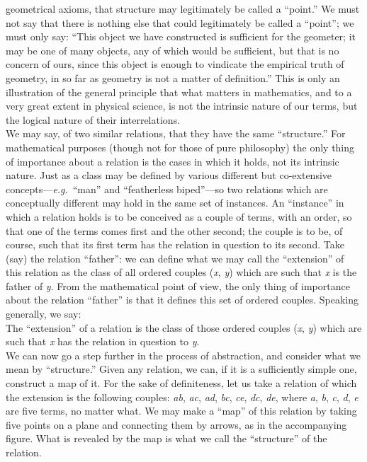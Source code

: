 {geometrical axioms, that structure may legitimately be called a
``point.'' We must not say that there is nothing else that could
legitimately be
called a ``point''; we must only say: ``This object we have constructed
is sufficient for the geometer; it may be one of many objects, any of
which would be sufficient, but that is no concern of ours, since this
object is enough to vindicate the empirical truth of geometry, in so
far as geometry is not a matter of definition.'' This is only an
illustration of the general principle that what matters in mathematics,
and to a very great extent in physical science, is not the intrinsic
nature of our terms, but the logical nature of their interrelations.\\
\indent We may say, of two similar relations, that they have the
same   ``structure.''
For mathematical purposes (though not for those of pure
philosophy) the only thing of importance about a relation is the cases
in which it holds, not its intrinsic nature. Just as a class may be
defined by various different but co-extensive concepts---\textit{e.g.}\ ``man'' and
\label{change:minor60}``featherless bi\-ped''---so two relations which are conceptually different
may hold in the same set of instances. An ``instance'' in which a
relation holds is to be conceived
as
a couple
of terms, with an order, so that one of the terms comes first and the
other second; the couple is to be, of course, such that its first term
has the relation in question to its second. Take (say) the relation
``father'': we can define what we may
call the
``extension'' of this relation as the class of all ordered
couples (\textit{x},
\textit{y})
which are such that \textit{x}
is the father of \textit{y}.
From the mathematical point
of view, the only thing of importance about the relation ``father'' is
that it defines this set of ordered couples. Speaking generally, we say:\\
\indent The ``extension'' of a relation is the class of those
ordered
couples (\textit{x},
\textit{y})
which
are such that \textit{x}
has the relation in question to \textit{y}.\\
\indent We can now go a step further in the process of
abstraction,
and
consider what we mean by ``structure.'' Given any relation, \lxonly{\figtwo\enlargethispage{\baselineskip}}we can, if it
is a sufficiently simple one, construct a map of it. For the sake of
definiteness,
let us take a relation of
which 
the
extension is the following couples: \textit{ab}, \textit{ac}, \textit{ad}, \textit{bc}, \textit{ce}, \textit{dc}, \textit{de},
where \textit{a}, \textit{b}, \textit{c}, \textit{d}, \textit{e} are five \aftonly{\figtwo}terms,
no \afouronly{\figtwo}matter \ebkonly{\figtwo}what. We may make
a ``map'' of this relation by taking five points on a plane
and connecting them by arrows, as in the accompanying fig\-ure. What is
revealed by the map \iphoneonly{\figtwo}is what we call the ``structure'' of the relation.

}
